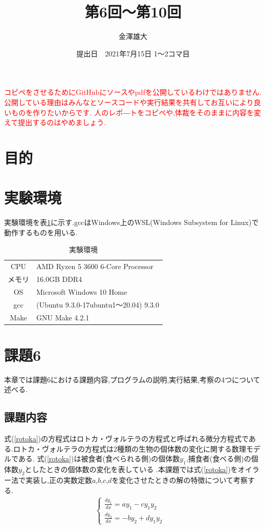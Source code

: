 \documentclass[a4j]{jarticle}
\title{第6回～第10回}
\date{提出日　2021年7月15日 1～2コマ目}
\author{金澤雄大}
\begin{document}
    \maketitle
    \thispagestyle{empty}
    \clearpage
    \addtocounter{page}{-1}

    \textcolor{red}{\Huge コピペをさせるためにGitHubにソースやpdfを公開しているわけではありません.公開している理由はみんなとソースコードや実行結果を共有してお互いにより良いものを作りたいからです.
    人のレポ―トをコピペや,体裁をそのままに内容を変えて提出するのはやめましょう.} \clearpage
    \section{目的}

    \section{実験環境}
      実験環境を表\ref{env}に示す.gccはWindows上のWSL(Windows Subsystem for Linux)で動作するものを用いる.
      \begin{table}[H]
        \caption{実験環境}
      \label{env}
      \begin{center}
          \begin{tabular}{c|l}\hline
            CPU & AMD Ryzen 5 3600 6-Core Processor \\ 
            メモリ & 16.0GB DDR4 \\
            OS & Microsoft Windows 10 Home \\
            gcc & (Ubuntu 9.3.0-17ubuntu1～20.04) 9.3.0 \\
            Make & GNU Make 4.2.1 \\ \hline
          \end{tabular}
      \end{center}
      \end{table}

      \section{課題6}
      本章では課題6における課題内容,プログラムの説明,実行結果,考察の4つについて述べる.
      \subsection{課題内容}
      式(\ref{rotoka})の方程式はロトカ・ヴォルテラの方程式と呼ばれる微分方程式である.ロトカ・ヴォルテラの方程式は2種類の生物の個体数の変化に関する数理モデルである.
      式(\ref{rotoka})は被食者(食べられる側)の個体数$y_1$,捕食者(食べる側)の個体数$y_2$としたときの個体数の変化を表している
      .本課題では式(\ref{rotoka})をオイラー法で実装し,正の実数定数$a$,$b$,$c$,$d$を変化させたときの解の特徴について考察する.
      \begin{eqnarray}
      \begin{cases}
        \frac{dy_1}{dx} = ay_1-cy_1y_2 & \\
        \frac{dy_2}{dx} = -by_2+dy_1y_2 &
      \end{cases}
      \label{rotoka}
    \end{eqnarray}
\end{document}
